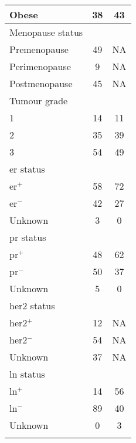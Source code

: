 \begin{ThreePartTable}
\begin{longtable}{lcc}
		\hspace{1em} Obese                   & 38 & 43 \\
		\hline
		\rule{0pt}{2.25ex}Menopause status  \\
		\hspace{1em} Premenopause            & 49 & NA\tnote{1}\\
		\hspace{1em} Perimenopause           & 9  & NA \\
		\hspace{1em} Postmenopause           & 45 & NA \\
		\hline
		\rule{0pt}{2.25ex}Tumour grade      \\
		\hspace{1em} 1                       & 14 & 11 \\
		\hspace{1em} 2                       & 35 & 39 \\
		\hspace{1em} 3                       & 54 & 49 \\
		\hline
		\rule{0pt}{2.25ex}\gls{er} status   \\
		\hspace{1em} \gls{er}$^+$            & 58 & 72 \\
		\hspace{1em} \gls{er}$^-$            & 42 & 27 \\
		\hspace{1em} Unknown                 & 3  & 0  \\
		\hline
		\rule{0pt}{2.25ex}\gls{pr} status   \\
		\hspace{1em} \gls{pr}$^+$            & 48 & 62 \\
		\hspace{1em} \gls{pr}$^-$            & 50 & 37 \\
		\hspace{1em} Unknown                 & 5  & 0  \\
		\hline
		\rule{0pt}{2.25ex}\gls{her2} status \\
		\hspace{1em} \gls{her2}$^+$          & 12 & NA \\
		\hspace{1em} \gls{her2}$^-$          & 54 & NA \\
		\hspace{1em} Unknown                 & 37 & NA \\
		\hline
		\rule{0pt}{2.25ex}\gls{ln} status   \\
		\hspace{1em} \gls{ln}$^+$            & 14 & 56\\
		\hspace{1em} \gls{ln}$^-$            & 89 & 40\\
		\hspace{1em} Unknown                 & 0  & 3 \\
		\hline
		\hline
		\insertTableNotes
	\end{longtable}
\end{ThreePartTable}

